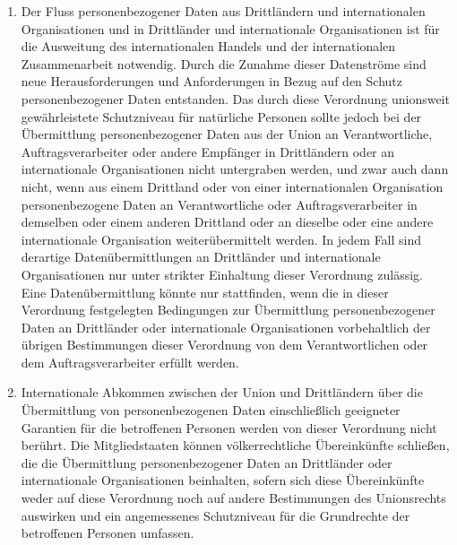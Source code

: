 \begin{enumerate}
   \item Der Fluss personenbezogener Daten aus Drittländern und internationalen Organisationen und in Drittländer und
    internationale Organisationen ist für die Ausweitung des internationalen Handels und der internationalen
    Zusammenarbeit notwendig. Durch die Zunahme dieser Datenströme sind neue Herausforderungen und Anforderungen in
    Bezug auf den Schutz personenbezogener Daten entstanden. Das durch diese Verordnung unionsweit gewährleistete
    Schutzniveau für natürliche Personen sollte jedoch bei der Übermittlung personenbezogener Daten aus der Union an
    Verantwortliche, Auftragsverarbeiter oder andere Empfänger in Drittländern oder an internationale Organisationen
    nicht untergraben werden, und zwar auch dann nicht, wenn aus einem Drittland oder von einer internationalen
    Organisation personenbezogene Daten an Verantwortliche oder Auftragsverarbeiter in demselben oder einem anderen
    Drittland oder an dieselbe oder eine andere internationale Organisation weiterübermittelt werden. In jedem Fall
    sind derartige Datenübermittlungen an Drittländer und internationale Organisationen nur unter strikter Einhaltung
    dieser Verordnung zulässig. Eine Datenübermittlung könnte nur stattfinden, wenn die in dieser Verordnung
    festgelegten Bedingungen zur Übermittlung personenbezogener Daten an Drittländer oder internationale Organisationen
    vorbehaltlich der übrigen Bestimmungen dieser Verordnung von dem Verantwortlichen oder dem Auftragsverarbeiter
    erfüllt werden.%
   \label{eg:101}
   

   \item Internationale Abkommen zwischen der Union und Drittländern über die Übermittlung von personenbezogenen Daten
    einschließlich geeigneter Garantien für die betroffenen Personen werden von dieser Verordnung nicht berührt. Die
    Mitgliedstaaten können völkerrechtliche Übereinkünfte schließen, die die Übermittlung personenbezogener Daten an
    Drittländer oder internationale Organisationen beinhalten, sofern sich diese Übereinkünfte weder auf diese
    Verordnung noch auf andere Bestimmungen des Unionsrechts auswirken und ein angemessenes Schutzniveau für die
    Grundrechte der betroffenen Personen umfassen.%
   \label{eg:102}
   


\end{enumerate}
